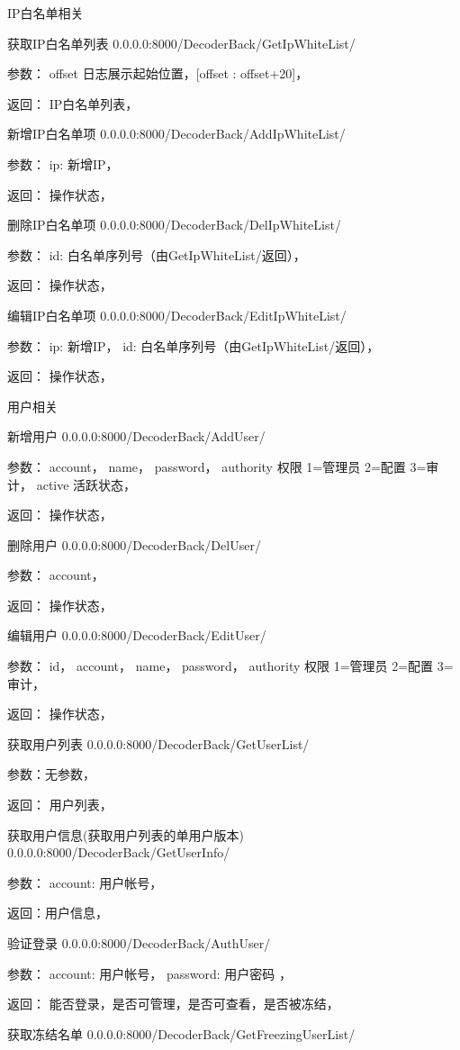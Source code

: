 IP白名单相关

获取IP白名单列表
0.0.0.0:8000/DecoderBack/GetIpWhiteList/

参数：
offset 日志展示起始位置，[offset : offset+20]，

返回：
IP白名单列表，

新增IP白名单项
0.0.0.0:8000/DecoderBack/AddIpWhiteList/

参数：
ip: 新增IP，

返回：
操作状态，

删除IP白名单项
0.0.0.0:8000/DecoderBack/DelIpWhiteList/

参数：
id: 白名单序列号（由GetIpWhiteList/返回），

返回：
操作状态，

编辑IP白名单项
0.0.0.0:8000/DecoderBack/EditIpWhiteList/

参数：
ip: 新增IP，
id: 白名单序列号（由GetIpWhiteList/返回），

返回：
操作状态，

用户相关

新增用户
0.0.0.0:8000/DecoderBack/AddUser/

参数：
account，
name，
password，
authority 权限 1=管理员 2=配置 3=审计，
active 活跃状态，

返回：
操作状态，

删除用户
0.0.0.0:8000/DecoderBack/DelUser/

参数：
account，

返回：
操作状态，

编辑用户
0.0.0.0:8000/DecoderBack/EditUser/

参数：
id，
account，
name，
password，
authority 权限 1=管理员 2=配置 3=审计，

返回：
操作状态，

获取用户列表
0.0.0.0:8000/DecoderBack/GetUserList/

参数：无参数，

返回：
用户列表，

获取用户信息(获取用户列表的单用户版本)
0.0.0.0:8000/DecoderBack/GetUserInfo/

参数：
account: 用户帐号，

返回：用户信息，

验证登录
0.0.0.0:8000/DecoderBack/AuthUser/

参数：
account: 用户帐号，
password: 用户密码 ，

返回：
能否登录，是否可管理，是否可查看，是否被冻结，

获取冻结名单
0.0.0.0:8000/DecoderBack/GetFreezingUserList/

